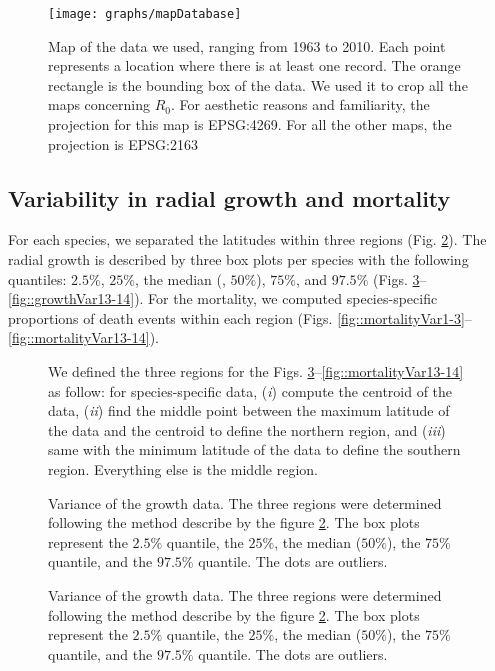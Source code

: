 \begin{refsection}
\begin{figure}[htb]
    \centering
	\texttt{[image: graphs/mapDatabase]}
	\caption{Map of the data we used, ranging from 1963 to 2010. Each point represents a location where there is at least one record. The orange rectangle is the bounding box of the data. We used it to crop all the maps concerning $ R_0 $. For aesthetic reasons and familiarity, the projection for this map is EPSG:4269. For all the other maps, the projection is EPSG:2163}
\label{fig::mapDatabase}
\end{figure}

\subsection{Variability in radial growth and mortality}
For each species, we separated the latitudes within three regions (Fig. \ref{fig::defineRegion}). The radial growth is described by three box plots per species with the following quantiles: $ 2.5 \% $, $ 25 \% $, the median (, $ 50 \% $), $ 75 \% $, and $ 97.5 \% $ (Figs. \ref{fig::growthVar1-3}--\ref{fig::growthVar13-14}). For the mortality, we computed species-specific proportions of death events within each region (Figs. \ref{fig::mortalityVar1-3}--\ref{fig::mortalityVar13-14}).

\begin{figure}
	\centering
	
	\caption{We defined the three regions for the Figs. \ref{fig::growthVar1-3}--\ref{fig::mortalityVar13-14} as follow: for species-specific data, (\textit{i}) compute the centroid of the data, (\textit{ii}) find the middle point between the maximum latitude of the data and the centroid to define the northern region, and (\textit{iii}) same with the minimum latitude of the data to define the southern region. Everything else is the middle region. \label{fig::defineRegion}}
\end{figure}

\begin{figure}
	\centering
	
	\caption{Variance of the growth data. The three regions were determined following the method describe by the figure \ref{fig::defineRegion}. The box plots represent the $ 2.5 \%$ quantile, the $ 25 \% $, the median ($ 50 \% $), the $ 75 \% $ quantile, and the $ 97.5 \% $ quantile. The dots are outliers. \label{fig::growthVar1-3}}
\end{figure}

\begin{figure}
	\centering
	
	\caption{Variance of the growth data. The three regions were determined following the method describe by the figure \ref{fig::defineRegion}. The box plots represent the $ 2.5 \%$ quantile, the $ 25 \% $, the median ($ 50 \% $), the $ 75 \% $ quantile, and the $ 97.5 \% $ quantile. The dots are outliers. \label{fig::growthVar4-6}}
\end{figure}


\end{refsection}
